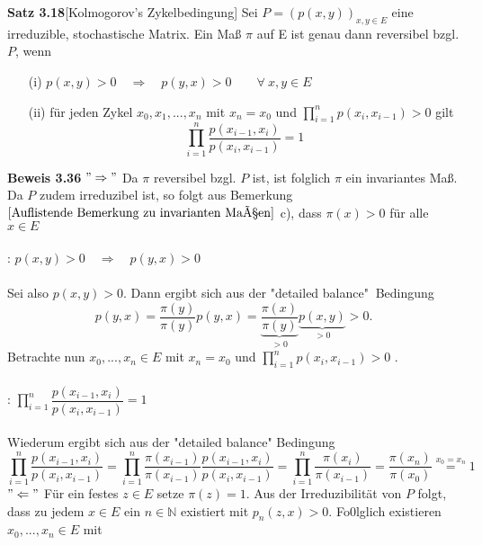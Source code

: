 \textbf{Satz 3.18}[Kolmogorov's Zykelbedingung]
\label{Kolmogorov's Zykelbedingung}
Sei $P = (p(x,y))_{x,y \in E}$ eine irreduzible, stochastische Matrix. Ein Maß $\pi$ auf E ist genau dann reversibel bzgl. $P$, wenn
\begin{itemize}
\item[(i)] $p(x,y)>0 \quad \Rightarrow \quad p(y,x)>0 \qquad \forall \: x,y \in E$ 
\item[(ii)] für jeden Zykel $x_{0},x_{1},...,x_{n}$ mit $x_{n} = x_{0}$ und $\prod_{i=1}^{n} p(x_{i},x_{i-1})>0$ gilt
\begin{equation*}
\prod_{i=1}^{n} \dfrac{p(x_{i-1},x_{i})}{p(x_{i},x_{i-1})} = 1
\end{equation*} 
\end{itemize}

\textbf{Beweis 3.36}
$"\Rightarrow"$ Da $\pi$ reversibel bzgl. $P$ ist, ist folglich $\pi$ ein invariantes Maß. Da $P$ zudem irreduzibel ist, so folgt aus Bemerkung $\ref{Auflistende Bemerkung zu invarianten Maßen}$ c), dass $\pi(x) > 0$ für alle $x \in E$
\\
\\
: $p(x,y)>0 \quad \Rightarrow \quad p(y,x)>0$
\\
\\
Sei also $p(x,y)>0$. Dann ergibt sich aus der "detailed balance"   $\:$Bedingung
\begin{equation*}
p(y,x) = \dfrac{\pi(y)}{\pi(y)} p(y,x) = \underbrace{\dfrac{\pi(x)}{\pi(y)}}_{>0} \underbrace{p(x,y)}_{>0} > 0.
\end{equation*}
Betrachte nun $x_{0},...,x_{n} \in E$ mit $x_{n} = x_{0}$ und  $\prod_{i=1}^{n} p(x_{i},x_{i-1})>0$ .
\\
\\
: $\prod_{i=1}^{n} \dfrac{p(x_{i-1},x_{i})}{p(x_{i},x_{i-1})} = 1$
\\
\\
Wiederum ergibt sich aus der "detailed balance" Bedingung
\begin{equation*}
\prod_{i=1}^{n} \dfrac{p(x_{i-1},x_{i})}{p(x_{i},x_{i-1})} = \prod_{i=1}^{n} \dfrac{\pi(x_{i-1})}{\pi(x_{i-1})} \dfrac{p(x_{i-1},x_{i})}{p(x_{i},x_{i-1})} = \prod_{i=1}^{n} \dfrac{\pi(x_{i})}{\pi(x_{i-1})} = \dfrac{\pi(x_{n})}{\pi(x_{0})} \stackrel{x_{0} = x_{n}}{=} 1
\end{equation*}
$"\Leftarrow"$ Für ein festes $z \in E$ setze $\pi(z) = 1$. Aus der Irreduzibilität von $P$ folgt, dass zu jedem $x \in E$ ein $n \in \mathbb{N}$ existiert mit $p_{n}(z,x) > 0$. Fo0lglich existieren $x_{0},...,x_{n} \in E$ mit
